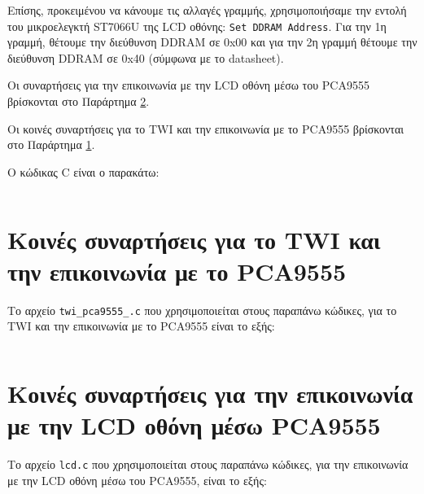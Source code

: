 \documentclass[a4paper]{article}
\begin{document}
\par Επίσης, προκειμένου να κάνουμε τις αλλαγές γραμμής, χρησιμοποιήσαμε την εντολή του μικροελεγκτή ST7066U της LCD οθόνης:
\texttt{Set DDRAM Address}. Για την 1η γραμμή, θέτουμε την διεύθυνση DDRAM σε 0x00 και για την 2η γραμμή θέτουμε την διεύθυνση
DDRAM σε 0x40 (σύμφωνα με το datasheet).


\par Οι συναρτήσεις για την επικοινωνία με την LCD οθόνη μέσω του PCA9555 βρίσκονται στο Παράρτημα \ref{lcd}.
\par Οι κοινές συναρτήσεις για το TWI και την επικοινωνία με το PCA9555 βρίσκονται στο Παράρτημα \ref{twi_pca9555}.

\par Ο κώδικας C είναι ο παρακάτω:
\inputminted[breaklines, linenos]{c}{../Lab5.3/main.c}

\appendix

\section{Κοινές συναρτήσεις για το TWI και την επικοινωνία με το PCA9555}
\label{twi_pca9555}

Το αρχείο \texttt{twi\_pca9555\_.c} που χρησιμοποιείται στους παραπάνω κώδικες, για το TWI και την επικοινωνία με το PCA9555 είναι το εξής:
\inputminted[breaklines, linenos]{c}{../common/twi_pca9555.c}

\section{Κοινές συναρτήσεις για την επικοινωνία με την LCD οθόνη μέσω PCA9555}
\label{lcd}

Το αρχείο \texttt{lcd.c} που χρησιμοποιείται στους παραπάνω κώδικες, για την επικοινωνία με την LCD οθόνη μέσω του PCA9555, είναι το εξής:
\inputminted[breaklines, linenos]{c}{../common/lcd.c}
\end{document}
